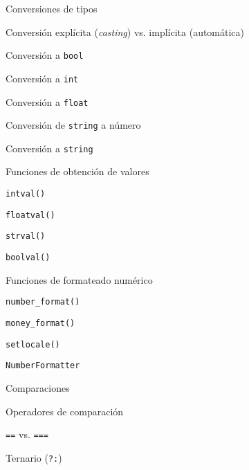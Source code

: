 \begin{longenum}
\begin{longenum}
\begin{longenum}
\begin{longenum}
\begin{longenum}
                \end{longenum}
            \end{longenum}
            \item Conversiones de tipos
            \begin{longenum}
                \item Conversión explícita (\textit{casting}) vs. implícita (automática)
                \item Conversión a \texttt{bool}
                \item Conversión a \texttt{int}
                \item Conversión a \texttt{float}
                \item Conversión de \texttt{string} a número
                \item Conversión a \texttt{string}
                \item Funciones de obtención de valores
                \begin{longenum}
                    \item \texttt{intval()}
                    \item \texttt{floatval()}
                    \item \texttt{strval()}
                    \item \texttt{boolval()}
                \end{longenum}
                \item Funciones de formateado numérico
                \begin{longenum}
                    \item \texttt{number\_format()}
                    \item \texttt{money\_format()}
                    \begin{longenum}
                        \item \texttt{setlocale()}
                    \end{longenum}
                    \item \texttt{NumberFormatter}
                \end{longenum}
            \end{longenum}
            \item Comparaciones
            \begin{longenum}
                \item Operadores de comparación
                \item \texttt{==} vs. \texttt{===}
                \item Ternario (\texttt{?:})

\end{longenum}
\end{longenum}
\end{longenum}
\end{longenum}
